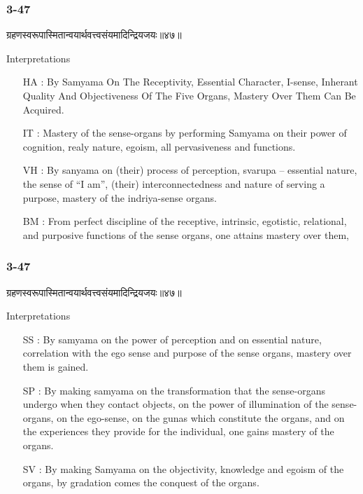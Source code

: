 \begin{frame}[fragile]\frametitle{3-47}
\begin{sanskrit}
ग्रहणस्वरूपास्मितान्वयार्थवत्त्वसंयमादिन्द्रियजयः॥४७॥
\end{sanskrit}

Interpretations
\begin{itemize}	
\item [HA]: By Samyama On The Receptivity, Essential Character, I-sense, Inherant Quality And Objectiveness Of The Five Organs, Mastery Over Them Can Be Acquired.
\item [IT]: Mastery of the sense-organs by performing Samyama on their power of cognition, realy nature, egoism, all pervasiveness and functions.		
\item [VH]: By sanyama on (their) process of perception, svarupa – essential nature, the sense of “I am”, (their) interconnectedness and nature of serving a purpose, mastery of the indriya-sense organs.
\item [BM]: From perfect discipline of the receptive, intrinsic, egotistic, relational, and purposive functions of the sense organs, one attains mastery over them,
\end{itemize}
\end{frame}

\begin{frame}[fragile]\frametitle{3-47}
\begin{sanskrit}
ग्रहणस्वरूपास्मितान्वयार्थवत्त्वसंयमादिन्द्रियजयः॥४७॥
\end{sanskrit}

Interpretations
\begin{itemize}	
\item [SS]: By samyama on the power of perception and on essential nature, correlation with the ego sense and purpose of the sense organs, mastery over them is gained.
\item [SP]: By making samyama on the transformation that the sense-organs undergo when they contact objects, on the power of illumination of the sense-organs, on the ego-sense, on the gunas which constitute the organs, and on the experiences they provide for the individual, one gains mastery of the organs.
\item [SV]: By making Samyama on the objectivity, knowledge and egoism of the organs, by gradation comes the conquest of the organs. 
\end{itemize}
\end{frame}


